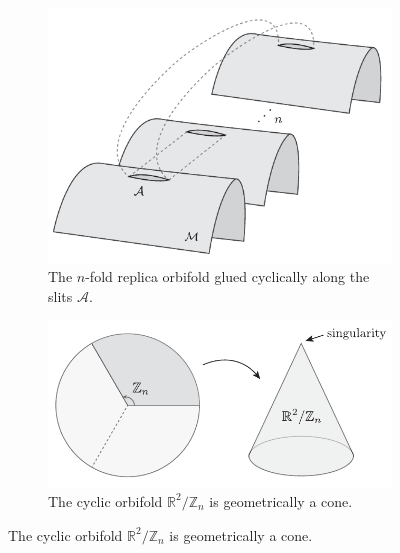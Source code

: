\documentclass{report}
\begin{document}
\begin{figure}[t]
	\centering
	\begin{subfigure}[b]{0.4\textwidth}
		\centering
		\includegraphics[width=\textwidth]{figs/december/replicas-cft.pdf}
		\caption{The $ n $-fold replica orbifold glued cyclically along the slits $ \mathcal{A} $.}
		\label{fig:entanglement-replicas}
	\end{subfigure}
	\hfill
	\begin{subfigure}[b]{0.49\textwidth}
		\centering
		\includegraphics[width=\textwidth]{figs/december/cone.pdf}
		\caption{The cyclic orbifold $ \mathbb{R}^2/\mathbb{Z}_n $ is geometrically 
		a cone.}
		\label{fig:entanglement-cone}
	\end{subfigure}
\end{figure}
\end{document}
